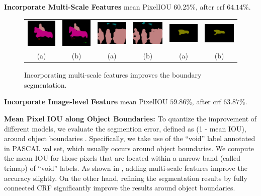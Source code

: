 {\bf{Incorporate Multi-Scale Features}}
mean PixelIOU $60.25\%$, after crf $64.14\%$.
\begin{figure}[ht]
  \centering
  \begin{tabular}{c c | c c | c c}
      \includegraphics[height=0.12\linewidth]{fig/boundary_refine/vgg128noup_2007_000783.png} &
      \includegraphics[height=0.12\linewidth]{fig/boundary_refine/vgg128ms_2007_000783.png} &
      \includegraphics[height=0.12\linewidth]{fig/boundary_refine/vgg128noup_2007_001284.png} &
      \includegraphics[height=0.12\linewidth]{fig/boundary_refine/vgg128ms_2007_001284.png} &
      \includegraphics[height=0.12\linewidth]{fig/boundary_refine/vgg128noup_2007_001289.png} &
      \includegraphics[height=0.12\linewidth]{fig/boundary_refine/vgg128ms_2007_001289.png} \\
      (a) & (b) & (a) & (b) & (a) & (b)
  \end{tabular}
  \label{fig:msBoundary}
  \caption{Incorporating multi-scale features improves the boundary segmentation.}
\end{figure}

{\bf{Incorporate Image-level Feature}} 
mean PixelIOU $59.86\%$, after crf $63.87\%$.

{\bf{Mean Pixel IOU along Object Boundaries: }}
To quantize the improvement of different models, we evaluate the segmention error, defined as (1 - mean IOU), around object boundaries \citep{kohli2009robust, krahenbuhl2011efficient}. Specifically, we take use of the ``void'' label annotated in PASCAL val set, which usually occurs around object boundaries. We compute the mean IOU for those pixels that are located within a narrow band (called trimap) of ``void'' labels. As shown in , adding multi-scale features improve the accuracy slightly. On the other hand, refining the segmentation results by fully connected CRF significantly improve the results around object boundaries. 

